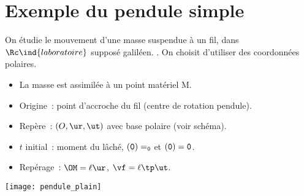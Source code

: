 \documentclass[../main/main.tex]{subfiles}
\begin{document}
\section{Exemple du pendule simple}
\hspace*{-0.75cm}
\begin{minipage}{0.70\linewidth}
    \begin{enumerate}[label=\sqenumi]
         On étudie le mouvement d'une masse
            suspendue à un fil, dans $\Rc\ind{laboratoire}$ supposé galiléen.
        .
         On choisit d'utiliser des coordonnées polaires.
            \begin{itemize}
                \item La masse est assimilée à un point matériel M.
                \item Origine~: point d'accroche du fil (centre de rotation
                    pendule).
                \item Repère~: $(O,\ur,\ut)$ avec base polaire (voir schéma).
                \item $t$ initial~: moment du lâché, $\tt(0) = \tt_0$ et
                    $\tt(0) = 0$.
                \item Repérage~: $\OM = \ell\ur$, $\vf = \ell\tp\ut$.
            \end{itemize}
    \end{enumerate}
\end{minipage}
\hfill
\begin{minipage}{0.25\linewidth}
    \begin{center}
        \texttt{[image: pendule\_plain]}
    \end{center}
\end{minipage}
\end{document}
